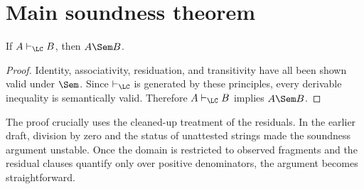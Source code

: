 \section{Main soundness theorem}
\begin{theorem}[Soundness]
If $A \vdash_{\LC} B$, then $A \Sem B$.
\end{theorem}

\begin{proof}
Identity, associativity, residuation, and transitivity have all been shown valid under $\Sem$.
Since $\vdash_{\LC}$ is generated by these principles, every derivable inequality is semantically
valid. Therefore $A \vdash_{\LC} B$ implies $A \Sem B$.
\end{proof}

\begin{remark}
The proof crucially uses the cleaned-up treatment of the residuals. In the earlier draft, division
by zero and the status of unattested strings made the soundness argument unstable. Once the
domain is restricted to observed fragments and the residual clauses quantify only over positive
denominators, the argument becomes straightforward.
\end{remark}

